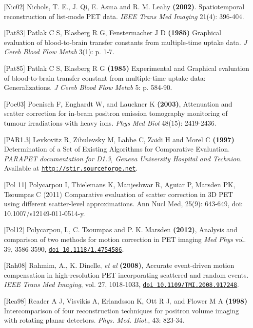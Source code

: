 \documentclass{article}
\def\url#1#2{\mbox{\href{#1}{\tt #2}}}
\begin{document}
{{{[}Nic02] Nichols, T. E., J. Qi, E. Asma and R. M. Leahy \textbf{(2002)}. Spatiotemporal reconstruction of list-mode PET data.  \textit{IEEE Trans Med Imaging} 21(4): 396-404.

{[}Pat83] Patlak C S, Blasberg R G, Fenstermacher J D \textbf{(1985)}  Graphical evaluation of blood-to-brain 
transfer constants from multiple-time uptake data. \textit{J Cereb Blood Flow Metab} 3(1): p. 1-7.

{[}Pat85] Patlak C S, Blasberg R G \textbf{(1985)}  Experimental and Graphical evaluation of blood-to-brain 
transfer constant from multiple-time uptake data: Generalizations. \textit{J Cereb Blood Flow Metab} 5: p. 584-90.

{[}Poe03{]} Poenisch F, Enghardt W, and Lauckner K \textbf{(2003)}, 
Attenuation and scatter correction for in-beam positron emission tomography 
monitoring of tumour irradiations with heavy ions. \textit { Phys Med Biol } 48(15): 2419-2436. 

 {[}PAR1.3] Levkovitz R, Zibulevsky M, Labbe C, Zaidi H and Morel 
C \textbf{(1997)} Determination of a Set of Existing Algorithms for 
Comparative Evaluation. \textit{PARAPET documentation for D1.3, Geneva 
University Hospital and Technion}. \\
Available at \url{http://stir.sourceforge.net }{http://stir.sourceforge.net}. 

[Pol 11] Polycarpou I, Thielemans K, Manjeshwar R, Aguiar P, Marsden PK,
Tsoumpas C (2011) Comparative evaluation of scatter correction in 3D PET
using different scatter-level approximations. Ann Nucl Med, 25(9):
643-649, doi: 10.1007/s12149-011-0514-y.

[Pol12] Polycarpou, I., C.
Tsoumpas and P. K. Marsden \textbf{(2012)}, Analysis and
comparison of two methods for motion correction in PET imaging
\textit{Med Phys} vol. 39, 3586-3590, 
\url{http://dx.doi.org/10.1118/1.4754586}{doi 10.1118/1.4754586}.


[Rah08] Rahmim, A., K.
Dinelle, \textit{et al} \textbf{(2008)}, Accurate event-driven motion compensation
in high-resolution PET incorporating scattered and random events. \textit{IEEE Trans
Med Imaging}, vol. 27, 1018-1033, 
\url{http://dx.doi.org/10.1109/TMI.2008.917248}{doi 10.1109/TMI.2008.917248}.


 {[}Rea98] Reader A J, Visvikis A, Erlandsson K, Ott R J, and Flower 
M A \textbf{(1998)} Intercomparison of four reconstruction techniques 
for positron volume imaging with rotating planar detectors. \textit{Phys. 
Med. Biol.}, 43: 823-34.


}}
\end{document}
